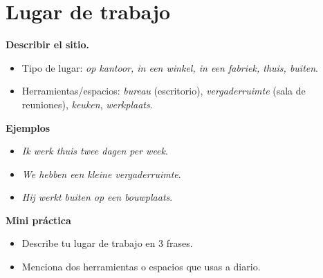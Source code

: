 \section{Lugar de trabajo}
\textbf{Describir el sitio.}
\begin{itemize}[leftmargin=*]
  \item Tipo de lugar: \textit{op kantoor, in een winkel, in een fabriek, thuis, buiten}.
  \item Herramientas/espacios: \textit{bureau} (escritorio), \textit{vergaderruimte} (sala de reuniones), \textit{keuken}, \textit{werkplaats}.
\end{itemize}

\textbf{Ejemplos}
\begin{itemize}[leftmargin=*]
  \item \textit{Ik werk thuis twee dagen per week}.
  \item \textit{We hebben een kleine vergaderruimte}.
  \item \textit{Hij werkt buiten op een bouwplaats}.
\end{itemize}

\textbf{Mini práctica}
\begin{itemize}[leftmargin=*]
  \item Describe tu lugar de trabajo en 3 frases.
  \item Menciona dos herramientas o espacios que usas a diario.
\end{itemize}
